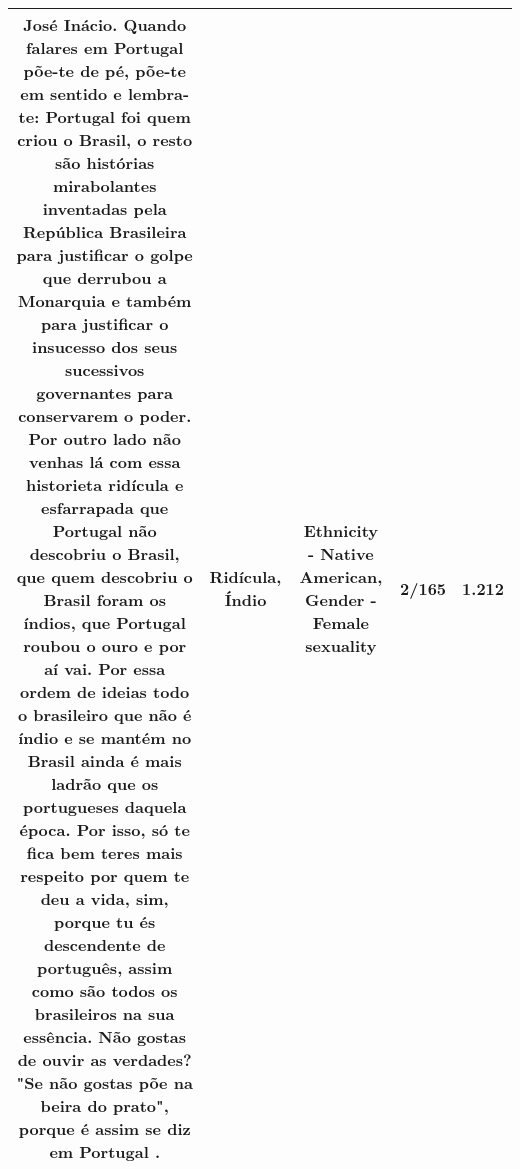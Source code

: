 \documentclass[11pt]{article}
\newlength\mylength
\begin{document}
\begin{center}
\begin{longtable}{|C{.65\mylength}|C{.30\mylength}|C{.12\mylength}|C{.12\mylength}|C{.12\mylength}|}
  \small José Inácio. Quando falares em Portugal põe-te de pé, põe-te em sentido e lembra-te: Portugal foi quem criou o Brasil, o resto são histórias mirabolantes  inventadas pela República Brasileira para justificar o golpe que derrubou a Monarquia e também para justificar o insucesso dos seus sucessivos governantes para conservarem o poder. Por outro lado não venhas lá com essa historieta \textbf{ridícula} e esfarrapada que Portugal não descobriu o Brasil, que quem descobriu o Brasil foram os índios, que Portugal roubou o ouro e por aí vai. Por essa ordem de ideias todo o brasileiro que não é \textbf{índio} e se mantém no Brasil ainda é mais ladrão que os portugueses daquela época. Por isso, só te fica bem teres mais respeito por quem te deu a vida, sim, porque tu és descendente de português, assim como são todos os brasileiros na sua essência. Não gostas de ouvir as verdades?  "Se não gostas põe na beira do prato", porque é assim se diz em Portugal .\normalsize   & Ridícula, Índio & Ethnicity - Native American, Gender - Female sexuality & 2/165 & 1.212 \\  \hline
  
\end{longtable}
\end{center}
\end{document}
